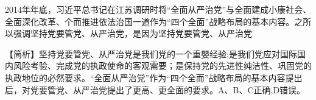 \question 2014年年底，习近平总书记在江苏调研时将``全面从严治党''与全面建成小康社会、全面深化改革、个而推进依法治国一道作为``四个全面''战略布局的基本内容。之所以强调坚持党要管党、从严治党，是因为坚持党要管党、从严治党
\par{}
\begin{solution}【简析】坚持党要管党、从严治党是我们党的一个重嬰经验;是我们党应对国际国内风险考验、完成党的执政使命的客观需要；是保持党的先进性纯洁性、巩固党的执政地位的必然要求。``全面从严治党''作为``四个全而''战略布局的基本内容提出后，对党要管党、从严治党提出了更高、更全面的要求。A、B、C正确,D错误。
\end{solution}
